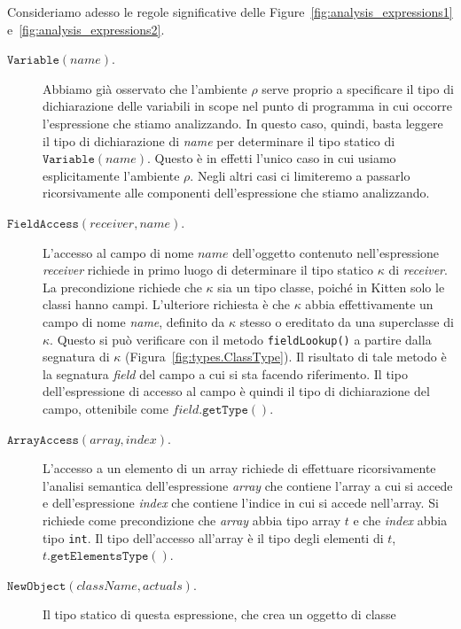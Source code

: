 Consideriamo adesso le regole \piu significative delle
Figure~\ref{fig:analysis_expressions1} e~\ref{fig:analysis_expressions2}.
%
\begin{description}
\item[\underline{$\mathtt{Variable(\mathit{name})}$}.]
  Abbiamo gi\`a osservato che l'ambiente
  $\rho$ serve proprio a specificare il tipo di dichiarazione delle variabili
  in scope nel punto di programma in cui occorre l'espressione che stiamo
  analizzando. In questo caso, quindi, basta leggere il tipo di dichiarazione
  di \textit{name} per determinare il tipo statico di
  $\mathtt{Variable(\mathit{name})}$. Questo \`e in effetti l'unico caso in
  cui usiamo esplicitamente l'ambiente $\rho$. Negli altri casi ci limiteremo
  a passarlo ricorsivamente alle componenti dell'espressione che stiamo
  analizzando.
\item[\underline{$\mathtt{FieldAccess(\mathit{receiver},\mathit{name})}$}.]
  L'accesso al campo di nome $\mathit{name}$
  dell'oggetto contenuto nell'espressione \textit{receiver} richiede
  in primo luogo di determinare il tipo statico $\kappa$ di \textit{receiver}.
  La precondizione richiede che $\kappa$ sia un tipo classe, poich\'e in Kitten
  solo le classi hanno campi. L'ulteriore richiesta \`e che $\kappa$
  abbia effettivamente un campo di nome \textit{name}, definito da $\kappa$
  stesso o ereditato da una superclasse di $\kappa$. Questo si pu\`o
  verificare con il metodo \texttt{fieldLookup()} a partire dalla
  segnatura di $\kappa$ (Figura~\ref{fig:types.ClassType}).
  Il risultato di tale metodo \`e la segnatura \textit{field}
  del campo a cui si sta facendo riferimento. Il tipo dell'espressione di
  accesso al campo \`e quindi il tipo di dichiarazione del campo, ottenibile
  come $\mathit{field}\mathtt{.getType()}$.
\item[\underline{$\mathtt{ArrayAccess(\mathit{array},\mathit{index})}$}.]
  L'accesso a un elemento di un array richiede di effettuare ricorsivamente
  l'analisi semantica dell'espressione \textit{array}
  che contiene l'array a cui si accede
  e dell'espressione \textit{index}
  che contiene l'indice in cui si accede nell'array.
  Si richiede come precondizione che \textit{array}
  abbia tipo array $t$ e che \textit{index} abbia tipo \texttt{int}.
  Il tipo dell'accesso all'array \`e il tipo degli elementi di $t$, \cioe
  $t\mathtt{.getElementsType()}$.
\item[\underline{$\mathtt{NewObject(\mathit{className},\mathit{actuals})}$}.]
  Il tipo statico di questa espressione, che crea un oggetto di classe

\end{description}
